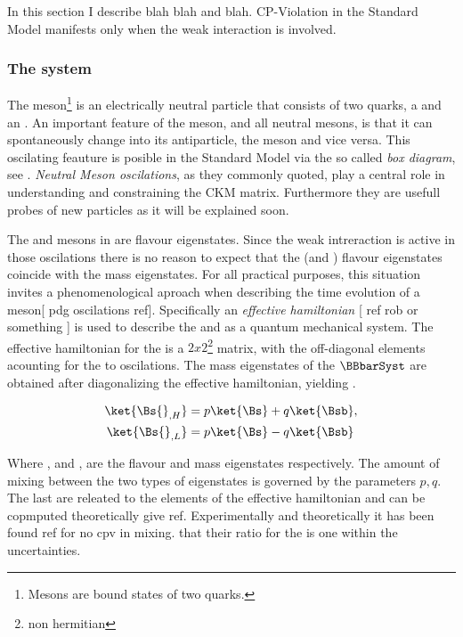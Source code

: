 

{\color{red} In this section I describe blah blah and blah.
CP-Violation in the Standard Model manifests only when the weak interaction is involved.}

\subsubsection{The \BBbarSyst system}
The \Bs meson\footnote{Mesons are bound states of two quarks.} is an electrically neutral
particle that consists of two quarks, a \bquarkbar and an \squark. An important feature of
the \Bs meson, and all neutral mesons, is that it can spontaneously change into its antiparticle,
the \Bsb meson and vice versa. This oscilating feauture is posible in the Standard Model via the
so called {\it box diagram}, see . {\it Neutral Meson oscilations}, as they commonly
quoted, play a central role in understanding and constraining the CKM matrix. Furthermore they are
usefull probes of new particles as it will be explained soon.

The \Bs and \Bsb mesons in  are flavour eigenstates. Since the weak intreraction
is active in those oscilations there is no reason to expect that the \Bs (and \Bsb) flavour eigenstates
coincide with the mass eigenstates. For all practical purposes, this situation invites a phenomenological
aproach when describing the time evolution of a \Bs meson[{\color{red} pdg oscilations ref}]. Specifically
an {\it effective hamiltonian} [{\color{red} ref rob or something} ] is used to describe the \Bs and \Bsb
as a quantum mechanical system. The effective hamiltonian for the \BBbarSyst is a $2x2$\footnote{non hermitian}
matrix, with the off-diagonal elements acounting for the \Bs to \Bsb oscilations.
The mass eigenstates of the $\BBbarSyst$ are obtained after diagonalizing the effective hamiltonian, yielding .

\begin{align}
\ket{\Bs{}_{,H}} &= p \ket{\Bs} + q \ket{\Bsb}, \nonumber \\
\ket{\Bs{}_{,L}} &= p \ket{\Bs} - q \ket{\Bsb}
\label{bs_mass_eigen}
\end{align}

\noindent Where \ket{\Bs}, \ket{\Bsb} and ,  are the flavour and mass
eigenstates respectively. The amount of mixing between the two types of eigenstates is governed by
the parameters $p,q$. The last are releated to the elements of the effective hamiltonian and can be
copmputed theoretically{\color{red} give ref}. Experimentally and theoretically it has been found{\color{red} ref for no cpv in mixing.}
that their ratio for the \BBbarSyst is one within the uncertainties.

